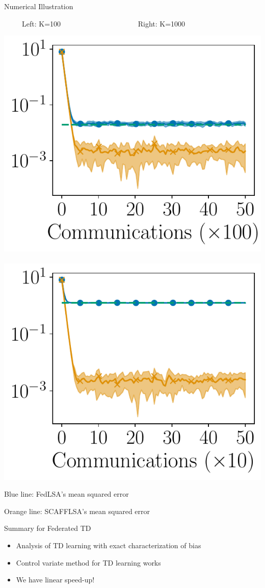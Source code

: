 \documentclass[aspectratio=169,12pt]{beamer}
\begin{document}
\begin{frame}{Numerical Illustration}
  \vspace{-0.5em}
  
  \begin{center}
    ~~~~~Left: K=100~~~~~~~~~~~~~~~~~~~~~
    Right: K=1000
 
    \vspace{-1em}
   
    \includegraphics[width=0.4\linewidth]{images/plot_hg_100_n100.pdf}
    ~~
    \includegraphics[width=0.4\linewidth]{images/plot_hg_1000_n100.pdf}
  \end{center}

  \vspace{-1em}

  Blue line: FedLSA's mean squared error

  \vspace{-1em}

  Orange line: SCAFFLSA's mean squared error
\end{frame}


\begin{frame}{Summary for Federated TD}
  \begin{itemize}
  \item Analysis of TD learning with exact characterization of bias
  \item Control variate method for TD learning works
  \item We have linear speed-up!
  \end{itemize}
\end{frame}

  
  
\end{document}
